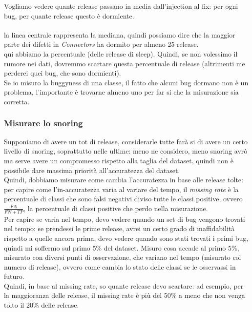 \documentclass{article}
\begin{document}
Vogliamo vedere quante release passano in media dall'injection al fix: per ogni bug, per quante release questo è dormiente.\\
\\ la linea centrale rappresenta la mediana, quindi possiamo dire che la maggior parte dei difetti in \textit{Connectors} ha dormito per almeno 25 release.
\\ qui abbiamo la percentuale (delle release di sleep). Quindi, se non volessimo il rumore nei dati, dovremmo scartare questa percentuale di release (altrimenti me perderei quei bug, che sono dormienti).\\ Se io misuro la buggyness di una classe, il fatto che alcuni bug dormano non è un problema, l'importante è trovarne almeno uno per far si che la misurazione sia corretta.
\subsubsection{Misurare lo snoring}
Supponiamo di avere un tot di release, considerarle tutte farà si di avere un certo livello di snoring, soprattutto nelle ultime: meno ne considero, meno snoring avrò ma serve avere un compromesso rispetto alla taglia del dataset, quindi non è possibile dare massima priorità all'accuratezza del dataset.\\ Quindi, dobbiamo misurare come cambia l'accuratezza in base alle release tolte: per capire come l'in-accuratezza varia al variare del tempo, il \textit{missing rate} è la percentuale di classi che sono falsi negativi diviso tutte le classi positive, ovvero $\frac{FN}{FN + TP}$, la percentuale di classi positive che perdo nella misurazione.\\ Per capire se varia nel tempo, devo vedere quando un set di bug vengono trovati nel tempo: se prendessi le prime release, avrei un certo grado di inaffidabilità rispetto a quelle ancora prima, devo vedere quando sono stati trovati i primi bug, quindi mi soffermo sul primo 5\% del dataset. Misuro cosa accade al primo 5\%, misurato con diversi punti di osservazione, che variano nel tempo (misurato col numero di release), ovvero come cambia lo stato delle classi se le osservassi in futuro.\\ Quindi, in base al missing rate, so quante release devo scartare: ad esempio, per la  maggioranza delle release, il missing rate è più del 50\% a meno che non venga tolto il 20\% delle release.
\end{document}
